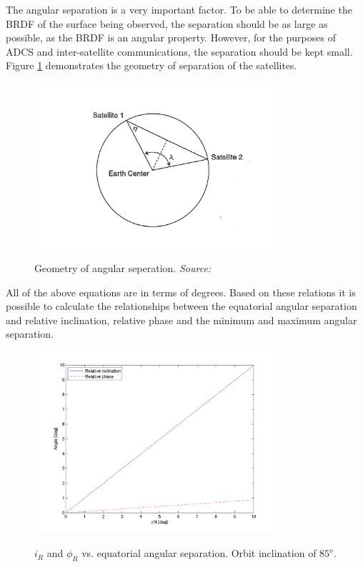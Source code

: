 \documentclass[11pt]{report}
\begin{document}
The angular separation is a very important factor. To be able to determine the BRDF of the surface being observed, the separation should be as large as possible, as the BRDF is an angular property. However, for the purposes of \ac{ADCS} and inter-satellite communications, the separation should be kept small. Figure \ref{fig:earthangle} demonstrates the geometry of separation of the satellites.

\begin{figure}[ht!]
\centering
\includegraphics[width=0.8\textwidth, angle=0]{img/geometry.png}
\label{fig:earthangle}
\caption{Geometry of angular seperation. \emph{Source: \cite{constDesign}}}
\end{figure}

All of the above equations are in terms of degrees. Based on these relations it is possible to calculate the relationships between the equatorial angular separation and relative inclination, relative phase and the minimum and maximum angular separation.

\begin{figure}[ht!]
\centering
\includegraphics[width=0.8\textwidth, angle=0]{img/relativeInc.png}
\label{fig:relativeI}
\caption{$i_R$ and $\phi_R$ vs. equatorial angular separation. Orbit inclination of $85^o$.}
\end{figure}
\end{document}
